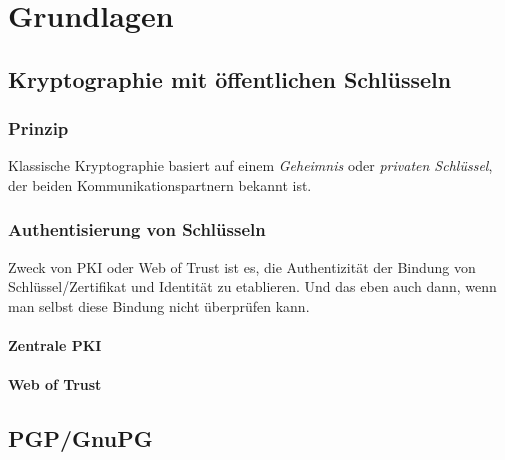 
\chapter{Grundlagen}
\label{ch:Grundlagen}

\section{Kryptographie mit öffentlichen Schlüsseln}
\label{ch:Grundlagen:sec:PublicKeyCrypto}

\subsection{Prinzip}
\label{ch:Grundlagen:sec:PublicKeyCrypto:subsec:Prinzip}

Klassische Kryptographie basiert auf einem \emph{Geheimnis} oder
\emph{privaten Schl\"ussel}, der beiden Kommunikationspartnern bekannt
ist. 

\subsection{Authentisierung von Schlüsseln}
\label{ch:Grundlagen:sec:PublicKeyCrypto:subsec:KeyAuth}

Zweck von PKI oder Web of Trust ist es, die Authentizit\"at der
Bindung von Schl\"ussel/Zertifikat und Identit\"at zu etablieren. Und
das eben auch dann, wenn man selbst diese Bindung nicht \"uberpr\"ufen
kann.

\subsubsection{Zentrale PKI}
\label{ch:Grundlagen:sec:PublicKeyCrypto:subsec:KeyAuth:subsubsec:PKI}

\subsubsection{Web of Trust}
\label{ch:Grundlagen:sec:PublicKeyCrypto:subsec:KeyAuth:subsubsec:WOT}

\section{PGP/GnuPG}
\label{ch:Grundlagen:sec:PGP}

